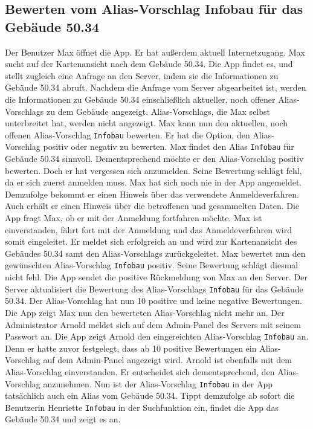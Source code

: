 \subsection{Bewerten vom Alias-Vorschlag Infobau für das Gebäude 50.34}

Der \Gls{Benutzer} Max öffnet die App.
Er hat außerdem aktuell Internetzugang.
Max sucht auf der \Gls{Kartenansicht} nach dem Gebäude 50.34.
Die App findet es, und stellt zugleich eine Anfrage an den \Gls{Server}, indem sie die Informationen zu Gebäude 50.34 abruft.
Nachdem die Anfrage vom \Gls{Server} abgearbeitet ist, werden die Informationen zu Gebäude 50.34 einschließlich aktueller, noch offener \Glspl{Alias-Vorschlag} zu dem Gebäude angezeigt.
\Glspl{Alias-Vorschlag}, die Max selbst unterbreitet hat, werden nicht angezeigt.
Max kann nun den aktuellen, noch offenen \Gls{Alias-Vorschlag} \texttt{Infobau} bewerten.
Er hat die Option, den \Gls{Alias-Vorschlag} positiv oder negativ zu bewerten.
Max findet den \Gls{Alias} \texttt{Infobau} für Gebäude 50.34 sinnvoll.
Dementsprechend möchte er den \Gls{Alias-Vorschlag} positiv bewerten.
Doch er hat vergessen sich anzumelden.
Seine Bewertung schlägt fehl, da er sich zuerst anmelden muss.
Max hat sich noch nie in der App angemeldet.
Demzufolge bekommt er einen Hinweis über das verwendete Anmeldeverfahren.
Auch erhält er einen Hinweis über die betroffenen und gesammelten Daten.
Die App fragt Max, ob er mit der Anmeldung fortfahren möchte.
Max ist einverstanden, fährt fort mit der Anmeldung und das Anmeldeverfahren wird somit eingeleitet.
Er meldet sich erfolgreich an und wird zur \Gls{Kartenansicht} des Gebäudes 50.34 samt den \Glspl{Alias-Vorschlag} zurückgeleitet.
Max bewertet nun den gewünschten \Gls{Alias-Vorschlag} \texttt{Infobau} positiv.
Seine Bewertung schlägt diesmal nicht fehl.
Die App sendet die positive Rückmeldung von Max an den \Gls{Server}.
Der \Gls{Server} aktualisiert die Bewertung des \Gls{Alias-Vorschlag}s \texttt{Infobau} für das Gebäude 50.34.
Der \Gls{Alias-Vorschlag} hat nun 10 positive und keine negative Bewertungen.
Die App zeigt Max nun den bewerteten \Gls{Alias-Vorschlag} nicht mehr an.
Der Administrator Arnold meldet sich auf dem \Gls{Admin-Panel} des \Gls{Server}s mit seinem Passwort an.
Die App zeigt Arnold den eingereichten \Gls{Alias-Vorschlag} \texttt{Infobau} an.
Denn er hatte zuvor festgelegt, dass ab 10 positive Bewertungen ein \Gls{Alias-Vorschlag} auf dem \Gls{Admin-Panel} angezeigt wird.
Arnold ist ebenfalls mit dem \Gls{Alias-Vorschlag} einverstanden.
Er entscheidet sich dementsprechend, den \Gls{Alias-Vorschlag} anzunehmen.
Nun ist der \Gls{Alias-Vorschlag} \texttt{Infobau} in der App tatsächlich auch ein \Gls{Alias} vom Gebäude 50.34.
Tippt demzufolge ab sofort die Benutzerin Henriette \texttt{Infobau} in der Suchfunktion ein, findet die App das Gebäude 50.34 und zeigt es an.
